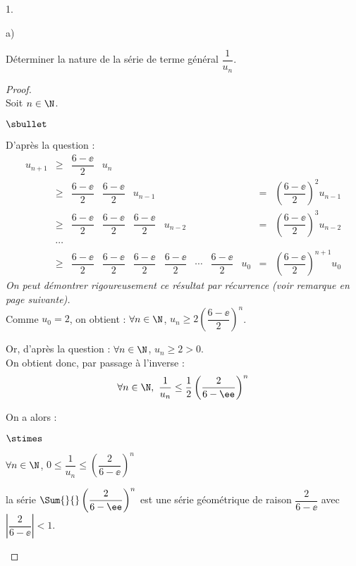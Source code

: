 \begin{noliste}{1.}
\begin{noliste}{a)}
    \newpage
	

  \item Déterminer la nature de la série de terme général
    $\dfrac{1}{u_n}$.
	
    \begin{proof}~\\
      Soit $n\in\N$.
      \begin{noliste}{$\sbullet$}
      \item D'après la question  :
        \[
        \begin{array}{rclllllllll}
          u_{n+1} & \geq & \dfrac{6-\ee}{2} & u_n
          \\[.4cm]
          & \geq & \dfrac{6-\ee}{2} & \dfrac{6-\ee}{2}
          &  u_{n-1} & & & &
          & = & \left(\dfrac{6-\ee}{2}\right)^2 u_{n-1}
          \\[.4cm]
          & \geq & \dfrac{6-\ee}{2} & \dfrac{6-\ee}{2} & 
          \dfrac{6-\ee}{2} & u_{n-2} & & &
          & = & \left(\dfrac{6-\ee}{2}\right)^3 u_{n-2}
          \\[.4cm]
          & \cdots & 
          \\[.2cm]
          & \geq & \dfrac{6-\ee}{2} & \dfrac{6-\ee}{2} &
          \dfrac{6-\ee}{2} & \dfrac{6-\ee}{2} & \cdots 
          & \dfrac{6-\ee}{2} & u_0 
          & = & \left(\dfrac{6-\ee}{2}\right)^{n+1} u_0
        \end{array}
        \]
        {\it On peut démontrer rigoureusement ce résultat par
          récurrence (voir remarque en page suivante).  }\\
        Comme $u_0=2$, on obtient : $\forall n\in\N$, $u_n \geq 2
        \left(\dfrac{6-\ee}{2}\right)^n$.
      \item Or, d'après la question  : $\forall n\in\N$,
        $u_n\geq 2 >0$.\\
        On obtient donc, par passage à l'inverse :
        \[
        \forall n \in \N, \ \dfrac{1}{u_n} \leq \dfrac{1}{2}
        \left(\dfrac{2}{6-\ee}\right)^n
        \]
      \item On a alors :
        \begin{noliste}{$\stimes$}
        \item $\forall n \in \N$, $0\leq \dfrac{1}{u_n} \leq
          \left(\dfrac{2}{6-\ee}\right)^n$
        \item la série $\Sum{}{} \left(\dfrac{2}{6-\ee}\right)^n$ est
          une série géométrique de raison $\dfrac{2}{6-\ee}$ avec
          $\left\vert
            \dfrac{2}{6-\ee} \right\vert <1$.\\[.2cm]

\end{noliste}
\end{noliste}
\end{proof}
\end{noliste}
\end{noliste}
